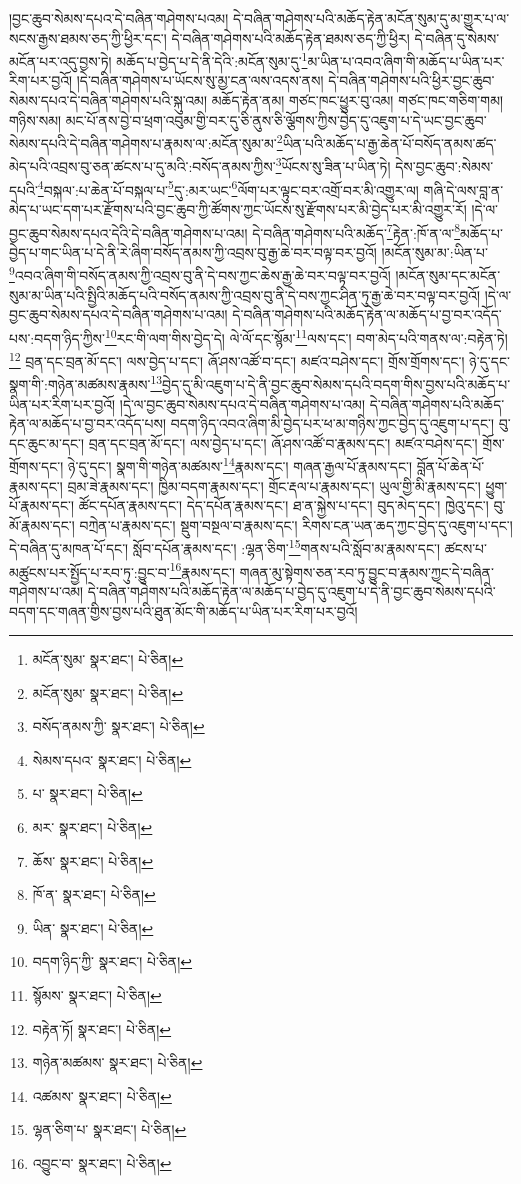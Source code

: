 །བྱང་ཆུབ་སེམས་དཔའ་དེ་བཞིན་གཤེགས་པའམ། དེ་བཞིན་གཤེགས་པའི་མཆོད་རྟེན་མངོན་སུམ་དུ་མ་གྱུར་པ་ལ་སངས་རྒྱས་ཐམས་ཅད་ཀྱི་ཕྱིར་དང་། དེ་བཞིན་གཤེགས་པའི་མཆོད་རྟེན་ཐམས་ཅད་ཀྱི་ཕྱིར། དེ་བཞིན་དུ་སེམས་མངོན་པར་འདུ་བྱས་ཏེ། མཆོད་པ་བྱེད་པ་དེ་ནི་དེའི་:མངོན་སུམ་དུ་\footnote{མངོན་སུམ་  སྣར་ཐང་།  པེ་ཅིན། }མ་ཡིན་པ་འབའ་ཞིག་གི་མཆོད་པ་ཡིན་པར་རིག་པར་བྱའོ། །དེ་བཞིན་གཤེགས་པ་ཡོངས་སུ་མྱ་ངན་ལས་འདས་ནས། དེ་བཞིན་གཤེགས་པའི་ཕྱིར་བྱང་ཆུབ་སེམས་དཔའ་དེ་བཞིན་གཤེགས་པའི་སྐུ་འམ། མཆོད་རྟེན་ནམ། གཙང་ཁང་ཕྱུར་བུ་འམ། གཙང་ཁང་གཅིག་གམ། གཉིས་སམ། མང་པོ་ནས་བྱེ་བ་ཕྲག་འབུམ་གྱི་བར་དུ་ཅི་ནུས་ཅི་ལྕོགས་ཀྱིས་བྱེད་དུ་འཇུག་པ་དེ་ཡང་བྱང་ཆུབ་སེམས་དཔའི་དེ་བཞིན་གཤེགས་པ་རྣམས་ལ་:མངོན་སུམ་མ་\footnote{མངོན་སུམ་  སྣར་ཐང་།  པེ་ཅིན། }ཡིན་པའི་མཆོད་པ་རྒྱ་ཆེན་པོ་བསོད་ནམས་ཚད་མེད་པའི་འབྲས་བུ་ཅན་ཚངས་པ་དུ་མའི་:བསོད་ནམས་ཀྱིས་\footnote{བསོད་ནམས་ཀྱི་  སྣར་ཐང་།  པེ་ཅིན། }ཡོངས་སུ་ཟིན་པ་ཡིན་ཏེ། དེས་བྱང་ཆུབ་:སེམས་དཔའི་\footnote{སེམས་དཔའ་  སྣར་ཐང་།  པེ་ཅིན། }བསྐལ་:པ་ཆེན་པོ་བསྐལ་པ་\footnote{པ་  སྣར་ཐང་།  པེ་ཅིན། }དུ་:མར་ཡང་\footnote{མར་  སྣར་ཐང་།  པེ་ཅིན། }ལོག་པར་ལྟུང་བར་འགྲོ་བར་མི་འགྱུར་ལ། གཞི་དེ་ལས་བླ་ན་མེད་པ་ཡང་དག་པར་རྫོགས་པའི་བྱང་ཆུབ་ཀྱི་ཚོགས་ཀྱང་ཡོངས་སུ་རྫོགས་པར་མི་བྱེད་པར་མི་འགྱུར་རོ། །དེ་ལ་བྱང་ཆུབ་སེམས་དཔའ་དེའི་དེ་བཞིན་གཤེགས་པ་འམ། དེ་བཞིན་གཤེགས་པའི་མཆོད་\footnote{ཆོས་  སྣར་ཐང་།  པེ་ཅིན། }རྟེན་:ཁོ་ན་ལ་\footnote{ཁོ་ན་  སྣར་ཐང་།  པེ་ཅིན། }མཆོད་པ་བྱེད་པ་གང་ཡིན་པ་དེ་ནི་རེ་ཞིག་བསོད་ནམས་ཀྱི་འབྲས་བུ་རྒྱ་ཆེ་བར་བལྟ་བར་བྱའོ། །མངོན་སུམ་མ་:ཡིན་པ་\footnote{ཡིན་  སྣར་ཐང་།  པེ་ཅིན། }འབའ་ཞིག་གི་བསོད་ནམས་ཀྱི་འབྲས་བུ་ནི་དེ་བས་ཀྱང་ཆེས་རྒྱ་ཆེ་བར་བལྟ་བར་བྱའོ། །མངོན་སུམ་དང་མངོན་སུམ་མ་ཡིན་པའི་སྤྱིའི་མཆོད་པའི་བསོད་ནམས་ཀྱི་འབྲས་བུ་ནི་དེ་བས་ཀྱང་ཤིན་ཏུ་རྒྱ་ཆེ་བར་བལྟ་བར་བྱའོ། །དེ་ལ་བྱང་ཆུབ་སེམས་དཔའ་དེ་བཞིན་གཤེགས་པ་འམ། དེ་བཞིན་གཤེགས་པའི་མཆོད་རྟེན་ལ་མཆོད་པ་བྱ་བར་འདོད་པས་:བདག་ཉིད་ཀྱིས་\footnote{བདག་ཉིད་ཀྱི་  སྣར་ཐང་།  པེ་ཅིན། }རང་གི་ལག་གིས་བྱེད་དེ། ལེ་ལོ་དང་སྙོམ་\footnote{སྙོམས་  སྣར་ཐང་།  པེ་ཅིན། }ལས་དང་། བག་མེད་པའི་གནས་ལ་:བརྟེན་ཏེ།\footnote{བརྟེན་ཏོ།  སྣར་ཐང་།  པེ་ཅིན། } བྲན་དང་བྲན་མོ་དང་། ལས་བྱེད་པ་དང་། ཞོ་ཤས་འཚོ་བ་དང་། མཛའ་བཤེས་དང་། གྲོས་གྲོགས་དང་། ཉེ་དུ་དང་སྣག་གི་:གཉེན་མཚམས་རྣམས་\footnote{གཉེན་མཚམས་  སྣར་ཐང་།  པེ་ཅིན། }བྱེད་དུ་མི་འཇུག་པ་དེ་ནི་བྱང་ཆུབ་སེམས་དཔའི་བདག་གིས་བྱས་པའི་མཆོད་པ་ཡིན་པར་རིག་པར་བྱའོ། །དེ་ལ་བྱང་ཆུབ་སེམས་དཔའ་དེ་བཞིན་གཤེགས་པ་འམ། དེ་བཞིན་གཤེགས་པའི་མཆོད་རྟེན་ལ་མཆོད་པ་བྱ་བར་འདོད་པས། བདག་ཉིད་འབའ་ཞིག་མི་བྱེད་པར་ཕ་མ་གཉིས་ཀྱང་བྱེད་དུ་འཇུག་པ་དང་། བུ་དང་ཆུང་མ་དང་། བྲན་དང་བྲན་མོ་དང་། ལས་བྱེད་པ་དང་། ཞོ་ཤས་འཚོ་བ་རྣམས་དང་། མཛའ་བཤེས་དང་། གྲོས་གྲོགས་དང་། ཉེ་དུ་དང་། སྣག་གི་གཉེན་མཚམས་\footnote{འཚམས་  སྣར་ཐང་།  པེ་ཅིན། }རྣམས་དང་། གཞན་རྒྱལ་པོ་རྣམས་དང་། བློན་པོ་ཆེན་པོ་རྣམས་དང་། བྲམ་ཟེ་རྣམས་དང་། ཁྱིམ་བདག་རྣམས་དང་། གྲོང་རྡལ་པ་རྣམས་དང་། ཡུལ་གྱི་མི་རྣམས་དང་། ཕྱུག་པོ་རྣམས་དང་། ཚོང་དཔོན་རྣམས་དང་། དེད་དཔོན་རྣམས་དང་། ཐ་ན་སྐྱེས་པ་དང་། བུད་མེད་དང་། ཁྱེའུ་དང་། བུ་མོ་རྣམས་དང་། བཀྲེན་པ་རྣམས་དང་། སྡུག་བསྔལ་བ་རྣམས་དང་། རིགས་ངན་ཡན་ཆད་ཀྱང་བྱེད་དུ་འཇུག་པ་དང་། དེ་བཞིན་དུ་མཁན་པོ་དང་། སློབ་དཔོན་རྣམས་དང་། :ལྷན་ཅིག་\footnote{ལྷན་ཅིག་པ་  སྣར་ཐང་།  པེ་ཅིན། }གནས་པའི་སློབ་མ་རྣམས་དང་། ཚངས་པ་མཚུངས་པར་སྤྱོད་པ་རབ་ཏུ་:བྱུང་བ་\footnote{འབྱུང་བ་  སྣར་ཐང་།  པེ་ཅིན། }རྣམས་དང་། གཞན་མུ་སྟེགས་ཅན་རབ་ཏུ་བྱུང་བ་རྣམས་ཀྱང་དེ་བཞིན་གཤེགས་པ་འམ། དེ་བཞིན་གཤེགས་པའི་མཆོད་རྟེན་ལ་མཆོད་པ་བྱེད་དུ་འཇུག་པ་དེ་ནི་བྱང་ཆུབ་སེམས་དཔའི་བདག་དང་གཞན་གྱིས་བྱས་པའི་ཐུན་མོང་གི་མཆོད་པ་ཡིན་པར་རིག་པར་བྱའོ། 